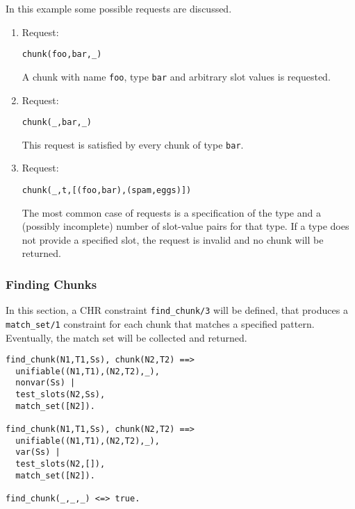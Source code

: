 \begin{example}
In this example some possible requests are discussed.

\begin{enumerate}
 \item Request:
\begin{lstlisting}
chunk(foo,bar,_)        
\end{lstlisting}

A chunk with name \verb|foo|, type \verb|bar| and arbitrary slot values is requested.

 \item Request:
\begin{lstlisting}
chunk(_,bar,_)        
\end{lstlisting}

This request is satisfied by every chunk of type \verb|bar|.

 \item Request:
\begin{lstlisting}
chunk(_,t,[(foo,bar),(spam,eggs)])        
\end{lstlisting}

The most common case of requests is a specification of the type and a (possibly incomplete) number of slot-value pairs for that type. If a type does not provide a specified slot, the request is invalid and no chunk will be returned.

\end{enumerate}

\end{example}

\subsubsection{Finding Chunks}

In this section, a CHR constraint \verb|find_chunk/3| will be defined, that produces a \verb|match_set/1| constraint for each chunk that matches a specified pattern. Eventually, the match set will be collected and returned.

\begin{lstlisting}
find_chunk(N1,T1,Ss), chunk(N2,T2) ==> 
  unifiable((N1,T1),(N2,T2),_), 
  nonvar(Ss) | 
  test_slots(N2,Ss), 
  match_set([N2]).
  
find_chunk(N1,T1,Ss), chunk(N2,T2) ==> 
  unifiable((N1,T1),(N2,T2),_), 
  var(Ss) | 
  test_slots(N2,[]), 
  match_set([N2]).

find_chunk(_,_,_) <=> true.
\end{lstlisting}

